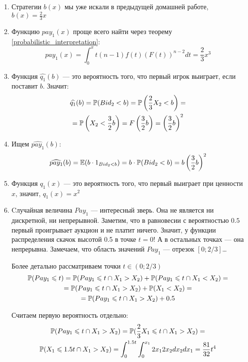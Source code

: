\begin{enumerate}
\begin{enumerate}
\item Стратегии $ b(x) $ мы уже искали в предыдущей домашней работе, $ b(x)=\frac{2}{3}x $
\item Функцию $ pay_{1}(x) $ проще всего найти через теорему \ref{probabilistic_interpretation}:
\begin{equation}
pay_{1}(x)=\int_{0}^{x}t(n-1)f(t)(F(t))^{n-2}dt=\frac{2}{3}x^{3}
\end{equation}
\item Функция $ \widehat{q_{1}}(b) $ — это вероятность того, что первый игрок выиграет, если поставит $ b $. Значит:
\begin{multline}
\widehat{q_{1}}(b)=\P(Bid_{2}<b)=\P\left(\frac{2}{3}X_{2}<b\right)=\\
=\P\left( X_{2}<\frac{3}{2}b\right)=F\left(\frac{3}{2}b\right)=\left(\frac{3}{2}b\right)^{2}
\end{multline}
\item Ищем $ \widehat{pay_{1}}(b) $:
\begin{equation}
\widehat{pay_{1}}(b)=\E(b\cdot 1_{Bid_{2}<b})=b\cdot \P(Bid_{2}<b)=b\left(\frac{3}{2}b\right)^{2}
\end{equation}
\item Функция $ q_{1}(x) $ — это вероятность того, что первый выиграет при ценности $ x $, значит, $ q_{1}(x)=x^{2} $
\item Cлучайная величина $ Pay_{1} $ — интересный зверь. Она не является ни дискретной, ни непрерывной. Заметим, что в равновесии с вероятностью $ 0.5 $ первый проигрывает аукцион и не платит ничего. Значит, у функции распределения скачок высотой 0.5 в точке $ t=0 $! А в остальных точках — она непрерывна. Замечаем, что область значений $ Pay_{1} $ — отрезок $ [0;2/3] $\ldots

Более детально рассматриваем точки $ t\in (0;2/3) $
\begin{multline}
\P(Pay_{1}\leq t)=\P(Pay_{1}\leq t \cap X_{1}>X_{2})+\P(Pay_{1}\leq t \cap X_{1}<X_{2})=\\
=\P(Pay_{1}\leq t \cap X_{1}>X_{2})+\P(X_{1}<X_{2})=\\
=\P(Pay_{1}\leq t \cap X_{1}>X_{2})+0.5
\end{multline}

Считаем первую вероятность отдельно:
\begin{multline}
\P(Pay_{1}\leq t \cap X_{1}>X_{2})=\P(\frac{2}{3}X_{1}\leq t \cap X_{1}>X_{2})=\\
\P(X_{1}\leq 1.5t \cap X_{1}>X_{2})=\int_{0}^{1.5t}\int_{0}^{x_{1}} 2x_{1}2x_{2}dx_{2}dx_{1}=\frac{81}{32}t^{4}
\end{multline}


\end{enumerate}
\end{enumerate}
